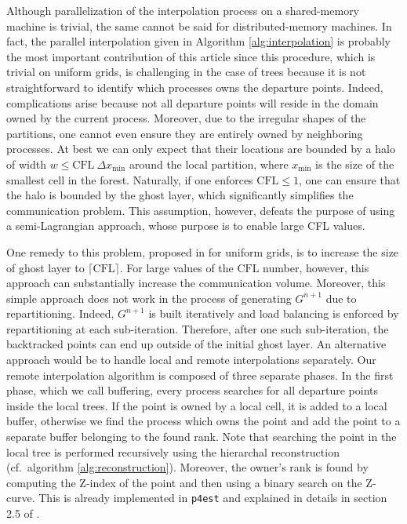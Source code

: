 Although parallelization of the interpolation process on a shared-memory
machine is trivial, the same cannot be said for distributed-memory machines.
In fact, the parallel interpolation given in Algorithm \ref{alg:interpolation}
is probably the most important contribution of this article since this
procedure, which is trivial on uniform grids, is challenging in the case of
trees because it is not straightforward to identify which processes owns the
departure points.
Indeed, complications arise because not all departure points will reside in the
domain owned by the current process. Moreover, due to the irregular shapes of
the partitions, one cannot even ensure they are entirely owned by neighboring
processes.
At best we can only expect that their locations are bounded by a halo of width
$w \le \text{CFL} \: \Delta x_{\min}$ around the local partition, where
$x_{\min}$ is the size of the smallest cell in the forest.
Naturally, if one enforces $\text{CFL} \le 1$, one can ensure that the halo is
bounded by the ghost layer, which significantly simplifies the communication
problem.
This assumption, however, defeats the purpose of using a semi-Lagrangian
approach, whose purpose is to enable large CFL values.

One remedy to this problem, proposed in \cite{Thomas;Cote:95:Massively-parallel-s} for uniform grids, is to increase the size of ghost layer to $\lceil \text{CFL} \rceil$. For large values of the $\text{CFL}$ number, however, this approach can substantially increase the communication volume. Moreover, this simple approach does not work in the process of generating $G^{n+1}$ due to repartitioning. Indeed, $G^{n+1}$ is built iteratively and load balancing is enforced by repartitioning at each sub-iteration. Therefore, after one such sub-iteration, the backtracked points can end up outside of the initial ghost layer. An alternative approach would be to handle local and remote interpolations separately. Our remote interpolation algorithm is composed of three separate phases. In the first phase, which we call buffering, every process searches for all departure points inside the local trees. If the point is owned by a local cell, it is added to a local buffer, otherwise we find the process which owns the point and add the point to a separate buffer belonging to the found rank. Note that searching the point in the local tree is performed recursively using the hierarchal reconstruction (cf.\ algorithm \ref{alg:reconstruction}). Moreover, the owner's rank is found by computing the Z-index of the point and then using a binary search on the Z-curve. This is already implemented in \texttt{p4est} and explained in details in section 2.5 of \cite{Burstedde;Wilcox;Ghattas:11:p4est:-Scalable-Algo}.

